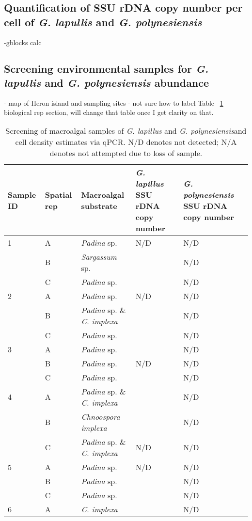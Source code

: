 \documentclass[12pt]{article}
\begin{document}
\subsection{Quantification of SSU rDNA copy number per cell of \emph{G. lapullis} and \emph{G. polynesiensis}}
-gblocks calc
\subsection{Screening environmental samples for \emph{G. lapullis} and \emph{G. polynesiensis} abundance}
- map of Heron island and sampling sites
- not sure how to label Table ~\ref{tbl:MacroalgaeTable} biological rep section, will change that table once I get clarity on that.
\FloatBarrier
\begin{longtable}{ | p{1cm} | p{1cm} | p{3cm} | p{4cm} | p{4cm} | }
\caption{Screening of macroalgal samples of \emph{G. lapillus} and \emph{G. polynesiensis}and cell density estimates via qPCR. N/D denotes not detected; N/A denotes not attempted due to loss of sample.}\\
\hline
\label{tbl:MacroalgaeTable}
\textbf{Sample ID}&\textbf{Spatial rep}&\textbf{Macroalgal substrate}&\textbf{\textit{G. lapillus} SSU rDNA copy number}&\textbf{\textit{G. polynesiensis} SSU rDNA copy number }\\
\hline
1&A&\emph{Padina} sp.&N/D&N/D\\
\hline
&B&\emph{Sargassum} sp.&&N/D\\
\hline
&C&\emph{Padina} sp.&&N/D\\
\hline
2&A&\emph{Padina} sp.&N/D&N/D\\
\hline
&B&\emph{Padina} sp. \& \emph{C. implexa}&&N/D\\
\hline
&C&\emph{Padina} sp.&&N/D\\
\hline
3&A&\emph{Padina} sp.&&N/D\\
\hline
&B&\emph{Padina} sp.&N/D&N/D\\
\hline
&C&\emph{Padina} sp.&&N/D\\
\hline
4&A&\emph{Padina} sp. \& \emph{C. implexa}&&N/D\\
\hline
&B&\emph{Chnoospora implexa}&&N/D\\
\hline
&C&\emph{Padina} sp. \& \emph{C. implexa}&N/D&N/D\\
\hline
5&A&\emph{Padina} sp.&N/D&N/D\\
\hline
&B&\emph{Padina} sp.&&N/D\\
\hline
&C&\emph{Padina} sp.&&N/D\\
\hline
6&A&\emph{C. implexa}&&N/D\\

\end{longtable}
\end{document}
